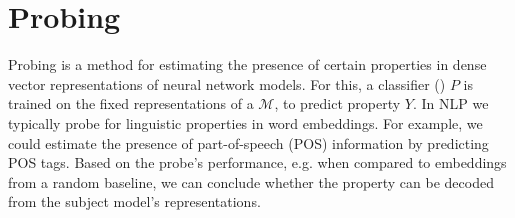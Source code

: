 \section{Probing}
Probing is a method for estimating the presence of certain properties in dense vector representations of neural network models. For this, a classifier () $P$ is trained on the fixed representations of a  $\mathcal{M}$, to predict property $Y$. In NLP we typically probe for linguistic properties in word embeddings. For example, we could estimate the presence of part-of-speech (POS) information by predicting POS tags. Based on the probe's performance, e.g. when compared to embeddings from a random baseline, we can conclude whether the property can be decoded from the subject model's representations.